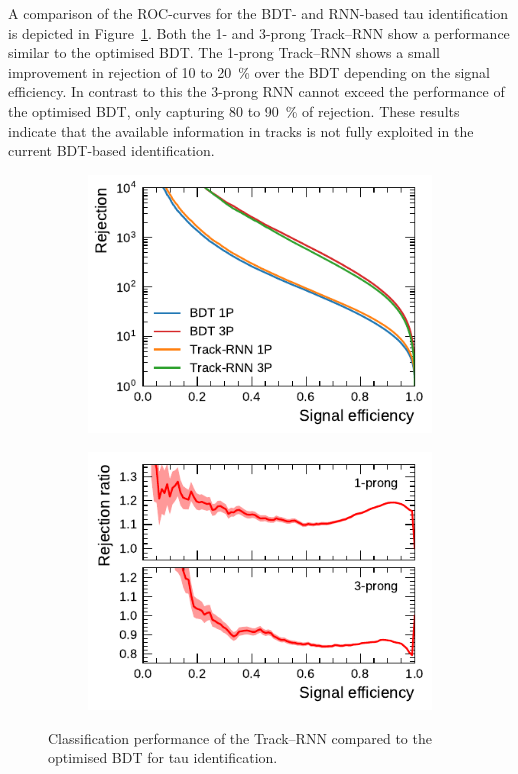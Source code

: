 A comparison of the ROC-curves for the BDT- and RNN-based tau identification is
depicted in Figure~\ref{fig:track_rnn_roc_ratios}. Both the 1- and 3-prong
Track--RNN show a performance similar to the optimised BDT. The 1-prong
Track--RNN shows a small improvement in rejection of \num{10} to
\SI{20}{\percent} over the BDT depending on the signal efficiency. In contrast
to this the 3-prong RNN cannot exceed the performance of the optimised BDT, only
capturing \num{80} to \SI{90}{\percent} of rejection. These results indicate
that the available information in tracks is not fully exploited in the current
BDT-based identification.

\begin{figure}[htb]
  \begin{subfigure}[t]{0.48\textwidth}
    \centering
    \includegraphics{./figures/rnn/track/roc.pdf}
  \end{subfigure}\hfill
  \begin{subfigure}[t]{0.48\textwidth}
    \centering
    \includegraphics{./figures/rnn/track/ratios.pdf}
  \end{subfigure}
  \caption{Classification performance of the Track--RNN compared to the
    optimised BDT for tau identification.}
  \label{fig:track_rnn_roc_ratios}
\end{figure}

